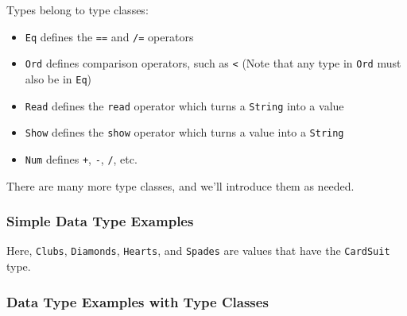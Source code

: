 Types belong to type classes:

\begin{itemize}
\tightlist
\item
  \texttt{Eq} defines the \texttt{==} and \texttt{/=} operators
\item
  \texttt{Ord} defines comparison operators, such as
  \texttt{\textless{}} (Note that any type in \texttt{Ord} must also be
  in \texttt{Eq})
\item
  \texttt{Read} defines the \texttt{read} operator which turns a
  \texttt{String} into a value
\item
  \texttt{Show} defines the \texttt{show} operator which turns a value
  into a \texttt{String}
\item
  \texttt{Num} defines \texttt{+}, \texttt{-}, \texttt{/}, etc.
\end{itemize}

There are many more type classes, and we'll introduce them as needed.

\hypertarget{simple-data-type-examples-1}{%
\subsubsection{Simple Data Type
Examples}\label{simple-data-type-examples-1}}

\begin{Shaded}
\begin{Highlighting}[]
  \OtherTok{=}  \OperatorTok{|}  \OperatorTok{|}  \OperatorTok{|} 
\end{Highlighting}
\end{Shaded}

Here, \texttt{Clubs}, \texttt{Diamonds}, \texttt{Hearts}, and
\texttt{Spades} are values that have the \texttt{CardSuit} type.

\hypertarget{data-type-examples-with-type-classes}{%
\subsubsection{Data Type Examples with Type
Classes}\label{data-type-examples-with-type-classes}}

\begin{Shaded}
\begin{Highlighting}[]
  \OtherTok{=}  \OperatorTok{|}  \OperatorTok{|}  \OperatorTok{|} 
    \NormalTok{ (}\NormalTok{, }\NormalTok{, }\NormalTok{, }\NormalTok{)}
\end{Highlighting}
\end{Shaded}

